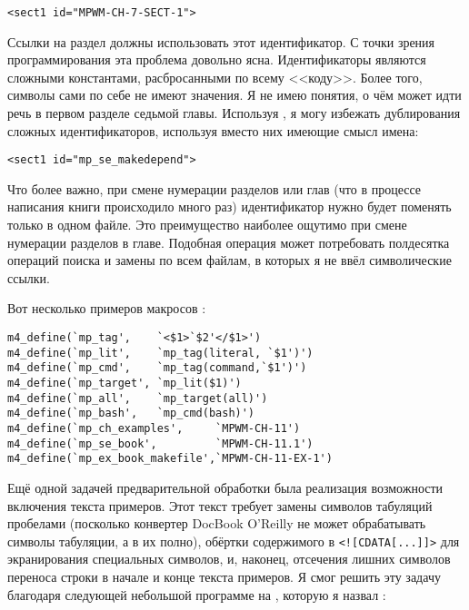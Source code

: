 \begin{verbatim}
<sect1 id="MPWM-CH-7-SECT-1">
\end{verbatim}

Ссылки на раздел должны использовать этот идентификатор. С точки
зрения программирования эта проблема довольно ясна. Идентификаторы
являются сложными константами, расбросанными по всему <<коду>>. Более
того, символы сами по себе не имеют значения. Я не имею понятия, о чём
может идти речь в первом разделе седьмой главы. Используя
, я могу избежать дублирования сложных идентификаторов,
используя вместо них имеющие смысл имена:

\begin{verbatim}
<sect1 id="mp_se_makedepend">
\end{verbatim}

Что более важно, при смене нумерации разделов или глав (что в процессе
написания книги происходило много раз) идентификатор нужно будет
поменять только в одном файле. Это преимущество наиболее ощутимо при
смене нумерации разделов в главе. Подобная операция может потребовать
полдесятка операций поиска и замены по всем файлам, в которых я не
ввёл символические ссылки.

Вот несколько примеров макросов :
\begin{verbatim}
m4_define(`mp_tag',    `<$1>`$2'</$1>')
m4_define(`mp_lit',    `mp_tag(literal, `$1')')
m4_define(`mp_cmd',    `mp_tag(command,`$1')')
m4_define(`mp_target', `mp_lit($1)')
m4_define(`mp_all',    `mp_target(all)')
m4_define(`mp_bash',   `mp_cmd(bash)')
m4_define(`mp_ch_examples',     `MPWM-CH-11')
m4_define(`mp_se_book',         `MPWM-CH-11.1')
m4_define(`mp_ex_book_makefile',`MPWM-CH-11-EX-1')
\end{verbatim}

Ещё одной задачей предварительной обработки была реализация
возможности включения текста примеров. Этот текст требует замены
символов табуляций пробелами (посколько конвертер DocBook O'Reilly не
может обрабатывать символы табуляции, а в  их полно),
обёртки содержимого в \verb|<![CDATA[...]]>| для экранирования
специальных символов, и, наконец, отсечения лишних символов переноса
строки в начале и конце текста примеров. Я смог решить эту задачу
благодаря следующей небольшой программе на , которую я
назвал :

